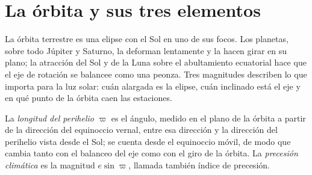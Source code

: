 \section{La órbita y sus tres elementos}\label{sec:b2:orbital-forcing:elements}

La órbita terrestre es una elipse con el Sol en uno de sus focos. Los planetas, sobre todo Júpiter y
Saturno, la deforman lentamente y la hacen girar en su plano; la atracción del Sol y de la Luna sobre el abultamiento
ecuatorial hace que el eje de rotación se balancee como una peonza. Tres magnitudes describen lo que importa para la
luz solar: cuán alargada es la elipse, cuán inclinado está el eje y en qué punto de la órbita
caen las estaciones.

\begin{definition}\label{def:b2:orbital-forcing:elements}
La \emph{longitud del perihelio} $\varpi$ es el ángulo, medido en
el plano de la órbita a partir de la dirección del equinoccio vernal, entre esa dirección y la
dirección del perihelio vista desde el Sol; se cuenta desde el equinoccio móvil, de modo que
cambia tanto con el balanceo del eje como con el giro de la órbita. La \emph{precesión
climática} es la magnitud $e\sin\varpi$, llamada también índice
de precesión.
\end{definition}

